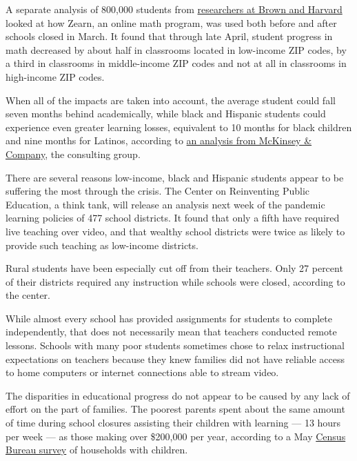 A separate analysis of 800,000 students from
\href{https://tracktherecovery.org/}{researchers at Brown and Harvard}
looked at how Zearn, an online math program, was used both before and
after schools closed in March. It found that through late April, student
progress in math decreased by about half in classrooms located in
low-income ZIP codes, by a third in classrooms in middle-income ZIP
codes and not at all in classrooms in high-income ZIP codes.

When all of the impacts are taken into account, the average student
could fall seven months behind academically, while black and Hispanic
students could experience even greater learning losses, equivalent to 10
months for black children and nine months for Latinos, according to
\href{https://www.mckinsey.com/industries/public-sector/our-insights/covid-19-and-student-learning-in-the-united-states-the-hurt-could-last-a-lifetime}{an
analysis from McKinsey \& Company}, the consulting group.

There are several reasons low-income, black and Hispanic students appear
to be suffering the most through the crisis. The Center on Reinventing
Public Education, a think tank, will release an analysis next week of
the pandemic learning policies of 477 school districts. It found that
only a fifth have required live teaching over video, and that wealthy
school districts were twice as likely to provide such teaching as
low-income districts.

Rural students have been especially cut off from their teachers. Only 27
percent of their districts required any instruction while schools were
closed, according to the center.

While almost every school has provided assignments for students to
complete independently, that does not necessarily mean that teachers
conducted remote lessons. Schools with many poor students sometimes
chose to relax instructional expectations on teachers because they knew
families did not have reliable access to home computers or internet
connections able to stream video.

The disparities in educational progress do not appear to be caused by
any lack of effort on the part of families. The poorest parents spent
about the same amount of time during school closures assisting their
children with learning --- 13 hours per week --- as those making over
\$200,000 per year, according to a May
\href{https://www.census.gov/data/tables/2020/demo/hhp2.html}{Census
Bureau survey} of households with children.

